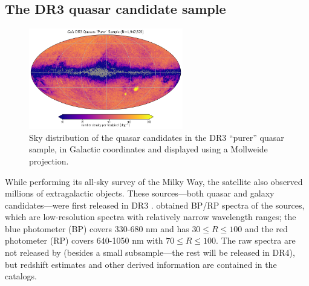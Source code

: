 \subsection{The \Gaia DR3 quasar candidate sample}
\label{sec:data_gaia}

\begin{figure}
    \centering
    \includegraphics[width=0.6\textwidth]{gpurer_2d.png}
    \caption{Sky distribution of the quasar candidates in the \Gaia DR3 ``purer'' quasar sample, in Galactic coordinates and displayed using a Mollweide projection.}
    \label{fig:gaia_2d_purer}
\end{figure}

While performing its all-sky survey of the Milky Way, the \Gaia satellite \citep{gaia_collaboration_gaia_2016} also observed millions of extragalactic objects.
These sources---both quasar and galaxy candidates---were first released in \Gaia DR3 \citep{gaia_collaboration_gaia_2022, gaia_collab_gaia_2022}.
\Gaia obtained BP/RP spectra of the sources, which are low-resolution spectra with relatively narrow wavelength ranges; the blue photometer (BP) covers 330-680 nm and has $30 \leq R \leq 100$ and the red photometer (RP) covers 640-1050 nm \citep{carrasco_internal_2021} with $70 \leq R \leq 100$.
The raw spectra are not released by \Gaia (besides a small subsample---the rest will be released in \Gaia DR4), but redshift estimates and other derived information are contained in the catalogs.

